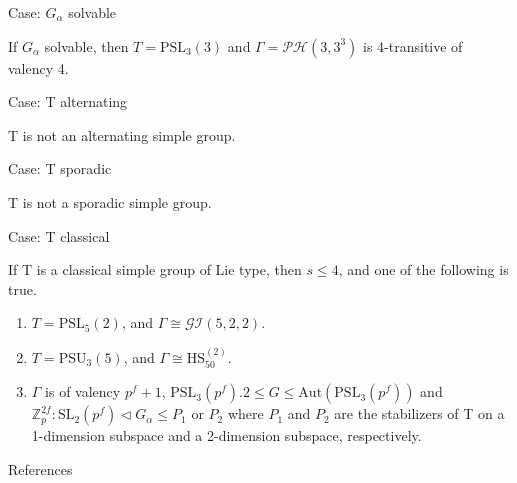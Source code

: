 \documentclass{beamer}
\def\SL{\mathrm{SL}}
\def\PSL{\mathrm{PSL}}
\def\PSU{\mathrm{PSU}}
\def\Aut{\mathrm{Aut}}
\def\HS{\mathrm{HS}}
\def\PH{\mathcal{PH}}
\def\GI{\mathcal{GI}}
\begin{document}
\begin{frame}{Case: $G_\alpha$ solvable}
\begin{lemma}[5.2]
If $G_\alpha$ solvable, then $T=\PSL_3(3)$ and $\Gamma=\PH(3,3^3)$ is 4-transitive of valency 4.
\end{lemma}
\end{frame}

\begin{frame}{Case: T alternating}
\begin{lemma}[5.3]
T is not an alternating simple group.
\end{lemma}
\end{frame}

\begin{frame}{Case: T sporadic}
\begin{lemma}[5.4]
T is not a sporadic simple group.
\end{lemma}
\end{frame}

\begin{frame}{Case: T classical }
\begin{lemma}[5.5]
If T is a classical simple group of Lie type, then $s\leq 4$, and one of the following is true.
\begin{enumerate}
	\item $T=\PSL_5(2)$, and $\Gamma\cong\GI(5,2,2)$.
	\item $T=\PSU_3(5)$, and $\Gamma\cong\HS_{50}^{(2)}$.
	\item $\Gamma$ is of valency $p^f+1$, $\PSL_3(p^f).2\leq G\leq\Aut(\PSL_3(p^f))$ and $\mathbb{Z}_p^{2f}:\SL_2(p^f)\triangleleft G_\alpha\leq P_1$ or $P_2$ where $P_1$ and $P_2$ are the stabilizers of T on a 1-dimension subspace and a 2-dimension subspace, respectively.
\end{enumerate}
\end{lemma}
\end{frame}



\begin{frame}{References}
\small
\printbibliography
\end{frame}
\end{document}
